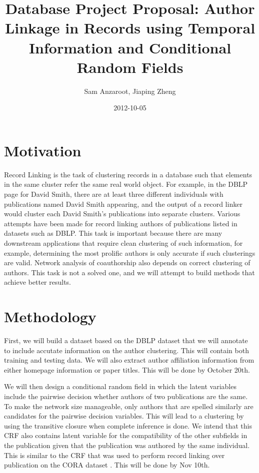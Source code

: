 \documentclass[]{article}
\title{Database Project Proposal: Author Linkage in Records using Temporal Information and Conditional Random Fields}
\author{Sam Anzaroot, Jiaping Zheng}
\date{2012-10-05}
\begin{document}
\ifpdf
{}
\else
{}
\fi

\maketitle

\section{Motivation} %
\label{sec:motivation}
Record Linking is the task of clustering records in a database such that elements in the same cluster refer the same real world object. For example, in the DBLP page for David Smith, there are at least three different individuals with publications named David Smith appearing, and the output of a record linker would cluster each David Smith's publications into separate clusters. Various attempts have been made for record linking authors of publications listed in datasets such as DBLP. This task is important because there are many downstream applications that require clean clustering of such information, for example, determining the most prolific authors is only accurate if such clusterings are valid. Network analysis of coauthorship also depends on correct clustering of authors. This task is not a solved one, and we will attempt to build methods that achieve better results.

\section{Methodology} %
\label{sec:methodology}
First, we will build a dataset based on the DBLP dataset that we will annotate to include accutate information on the author clustering. This will contain both training and testing data. We will also extract author affiliation information from either homepage information or paper titles.
This will be done by October 20th.

We will then design a conditional random field in which the latent variables include the pairwise decision whether authors of two publications are the same. To make the network size manageable, only authors that are spelled similarly are candidates for the pairwise decision variables. This will lead to a clustering by using the transitive closure when complete inference is done. We intend that this CRF also contains latent variable for the compatibility of the other subfields in the publication given that the publication was authored by the same individual. This is similar to the CRF that was used to perform record linking over publication on the CORA dataset \cite{Domingos04multi}.
This will be done by Nov 10th.
\end{document}
